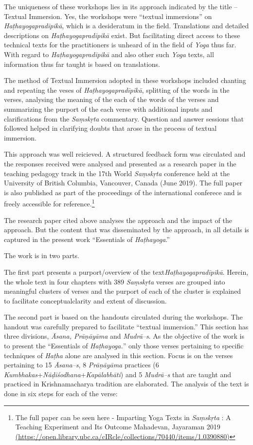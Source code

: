 The uniqueness of these workshops lies in its approach indicated by the title – Textual Immersion. Yes, the workshops were “textual immersions” on \textit{Haṭhayogapradīpikā}, which is a desideratum in the field. Translations and detailed descriptions on \textit{Haṭhayogapradīpikā} exist. But facilitating direct access to these technical texts for the practitioners is unheard of in the field of \textit{Yoga} thus far. With regard to \textit{Haṭhayogapradīpikā} and also other such \textit{Yoga} texts, all information thus far taught is based on translations.
\smallskip

The method of Textual Immersion adopted in these workshops included chanting and repeating the veses of \textit{Haṭhayogapradīpikā}, splitting of the words in the verses, analysing the meaning of the each of the words of the verses and summarizing the purport of the each verse with additional inputs and clarifications from the \textit{Saṃskṛta} commentary. Question and answer sessions that followed helped in clarifying doubts that arose in the process of textual immersion.
\smallskip

This approach was well reicieved. A structured feedback form was circulated and the responses received were  analysed and presented as a research paper in the teaching pedagogy track in the 17th World \textit{Saṃskṛta} conference held at the University of British Columbia, Vancouver, Canada (June 2019). The full paper is also published as part of the proceedings of the international conferece and is freely accessible for reference.\footnote{The full paper can be seen here - Imparting Yoga Texts in \textit{Saṃskṛta} : A Teaching Experiment and Its Outcome Mahadevan, Jayaraman 2019 \url{(https://open.library.ubc.ca/cIRcle/collections/70440/items/1.0390880)}}
\smallskip

The research paper cited above analyses the approach and the impact of the approach. But the content that was disseminated by the approach, in all details is captured in the present work “Essentials of \textit{Haṭhayoga}.”

The work is in two parts.

The first part presents a purport/overview of the text\break \textit{Haṭhayogapradīpikā}. Herein, the whole text in four chapters with 389 \textit{Saṃskṛta} verses are grouped into meaningful clusters of verses and the purport of each of the cluster is explained to facilitate conceptual\break clarity and extent of discussion.

The second part is based on the handouts circulated during the workshops. The handout was carefully prepared to facilitate “textual immersion.” This section has three divisions, \textit{Āsana, Prāṇāyāma} and \textit{Mudrā–s}. As the objective of the work is to present the “Essentials of \textit{Haṭhayoga.}” only those verses pertaining to specific techniques of \textit{Haṭha} alone are analysed in this section. Focus is on the verses pertaining to 15 \textit{Āsana–s}, 8 \textit{Prāṇāyāma} practices (6 \textit{Kumbhakas}+\textit{Nāḍīśodhana}+\textit{Kapālabhāti}) and 5 \textit{Mudrā–s} that are taught and practiced in Krishnamacharya tradition are elaborated. The analysis of the text is done in six steps for each of the verse:

